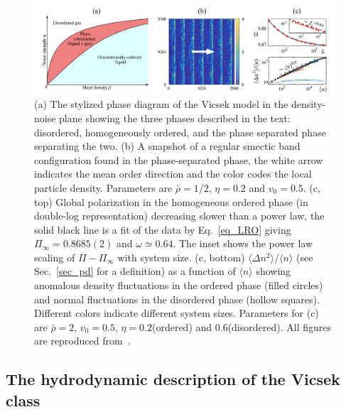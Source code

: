 \begin{figure}[t!]
	\includegraphics[width=\textwidth]{Figures/figVM.pdf}
	\caption{(a) The stylized phase diagram of the Vicsek model in the density-noise plane showing the three phases described in the text: disordered, homogeneously ordered, and the phase separated phase separating the two.
	(b) A snapshot of a regular smectic band configuration found in the phase-separated phase, the white arrow indicates the mean order direction and the color codes the local particle density. 
	Parameters are $\bar{\rho} = 1/2$, $\eta = 0.2$ and $v_0 = 0.5$.
	(c, top) Global polarization in the homogeneous ordered phase (in double-log representation) decreasing slower than a power law, the solid black line is a fit of the data by Eq.~\eqref{eq_LRO} giving $\Pi_\infty = 0.8685(2)$ and $\omega \simeq 0.64$. The inset shows the power law scaling of $\Pi - \Pi_\infty$ with system size.
	(c, bottom) $\langle \Delta n^2 \rangle/\langle n \rangle$ (see Sec.~\ref{sec_pd} for a definition) as a function of $\langle n \rangle$ showing anomalous density fluctuations in the ordered phase (filled circles) and normal fluctuations in the disordered phase (hollow squares). Different colors indicate different system sizes.
	Parameters for (c) are $\bar{\rho} = 2$, $v_0 = 0.5$, $\eta = 0.2$(ordered) and 0.6(disordered).
	All figures are reproduced from~\cite{DADAM_LesHouches}. 
	}
	\label{figVM}
\end{figure}

\subsection{The hydrodynamic description of the Vicsek class}

